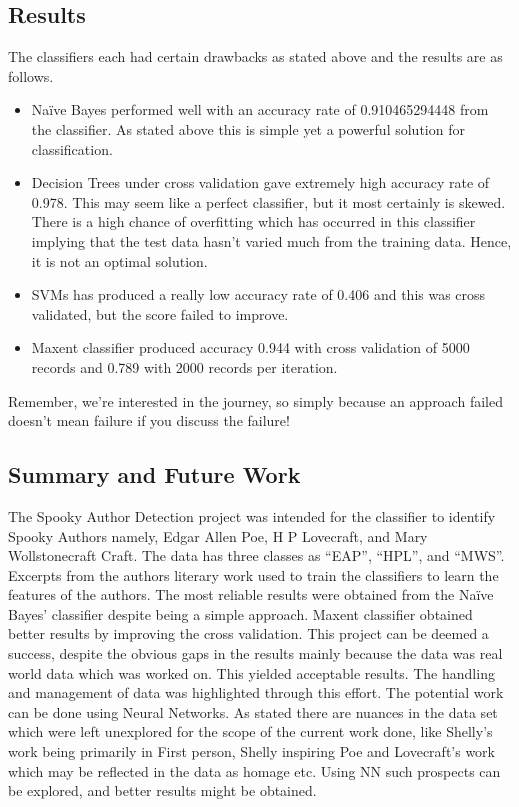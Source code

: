 \documentclass[fleqn,10pt]{SelfArx} %
\begin{document}
\subsection{Results}
The classifiers each had certain drawbacks as stated above and the results are as follows.
\begin{itemize}[noitemsep]
\item Naïve Bayes performed well with an accuracy rate of 0.910465294448 from the classifier. As stated above this is simple yet a powerful solution for classification.
\item Decision Trees under cross validation gave extremely high accuracy rate of 0.978. This may seem like a perfect classifier, but it most certainly is skewed. There is a high chance of overfitting which has occurred in this classifier implying that the test data hasn’t varied much from the training data. Hence, it is not an optimal solution.
\item SVMs has produced a really low accuracy rate of 0.406 and this was cross validated, but the score failed to improve.
\item Maxent classifier produced accuracy 0.944 with cross validation of 5000 records and 0.789 with 2000 records per iteration.
\end{itemize}
Remember, we're interested in the journey, so simply because an approach failed doesn't mean failure if you discuss the failure!
\subsection{Summary and Future Work}
The Spooky Author Detection project was intended for the classifier to identify Spooky Authors namely, Edgar Allen Poe, H P Lovecraft, and Mary Wollstonecraft Craft. The data has three classes as “EAP”, “HPL”, and “MWS”.  Excerpts from the authors literary work used to train the classifiers to learn the features of the authors. The most reliable results were obtained from the Naïve Bayes’ classifier despite being a simple approach. Maxent classifier obtained better results by improving the cross validation. This project can be deemed a success, despite the obvious gaps in the results mainly because the data was real world data which was worked on. This yielded acceptable results. The handling and management of data was highlighted through this effort.
The potential work can be done using Neural Networks. As stated there are nuances in the data set which were left unexplored for the scope of the current work done, like Shelly’s work being primarily in First person, Shelly inspiring Poe and Lovecraft’s work which may be reflected in the data as homage etc. Using NN such prospects can be explored, and better results might be obtained.
\end{document}

